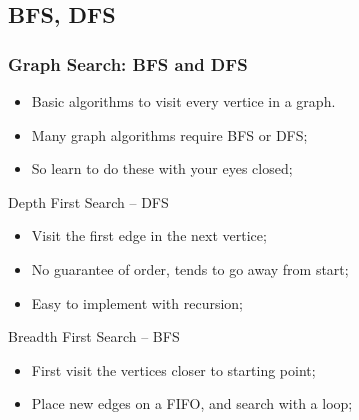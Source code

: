 \subsection{BFS, DFS}
\begin{frame}
  \frametitle{Graph Search: BFS and DFS}
    \begin{itemize}
    \item Basic algorithms to visit every vertice in a graph.
    \item Many graph algorithms require BFS or DFS;
    \item So learn to do these with your eyes closed;
    \end{itemize}

  \begin{block}{Depth First Search -- DFS}
    \begin{itemize}
      \item Visit the first edge in the next vertice;
      \item No guarantee of order, tends to go away from start;
      \item Easy to implement with recursion;
    \end{itemize}
  \end{block}

  \begin{block}{Breadth First Search -- BFS}
    \begin{itemize}
      \item First visit the vertices closer to starting point;
      \item Place new edges on a FIFO, and search with a loop;
    \end{itemize}
  \end{block}
\end{frame}

